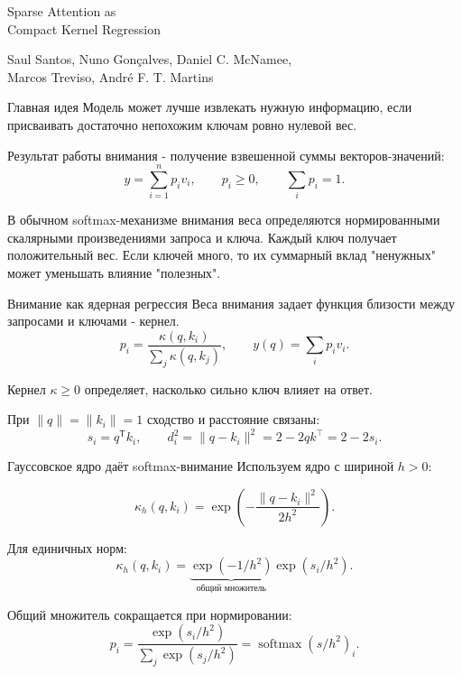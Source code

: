 \documentclass[aspectratio=169,12pt]{beamer}
\begin{document}
\begin{frame}[plain]
  \vspace{5mm}
  {Sparse Attention as\\[1mm]
  Compact Kernel Regression\par}
  \vspace{5mm}
  {\small Saul Santos, Nuno Gonçalves, Daniel C. McNamee,\\
  Marcos Treviso, André F. T. Martins\par}
  \vspace{5mm}
  {\small\phantom{Егор Прокопов}%
    }
\end{frame}

\begin{frame}{Главная идея}
  Модель может лучше извлекать нужную информацию, если присваивать достаточно непохожим
  ключам ровно нулевой вес.

  Результат работы внимания - получение взвешенной суммы векторов-значений:
  $$
    y=\sum_{i=1}^{n}p_i v_i,\qquad p_i\geq 0,\qquad \sum_i p_i=1.
  $$

  В обычном softmax-механизме внимания веса определяются нормированными скалярными
  произведениями запроса и ключа. Каждый ключ получает положительный вес.
  Если ключей много, то их суммарный вклад "ненужных" может уменьшать влияние "полезных". 
\end{frame}

\begin{frame}{Внимание как ядерная регрессия}
  Веса внимания задает функция близости между запросами и ключами - кернел.
  $$
    p_i=\frac{\kappa(q,k_i)}{\sum_j\kappa(q,k_j)},
    \qquad y(q)=\sum_i p_i v_i.
  $$
  
  Кернел $\kappa\geq 0$ определяет, насколько сильно ключ влияет на ответ.

  При $\|q\|=\|k_i\|=1$ сходство и расстояние связаны:
  $$
    s_i=q^{\mathsf T}k_i,
    \qquad d_i^2 = \|q-k_i\|^2 = 2 - 2qk^\top = 2 - 2s_i.
  $$
\end{frame}

\begin{frame}{Гауссовское ядро даёт softmax-внимание}
  Используем ядро с шириной \(h>0\):
  
  $$
    \kappa_{h}(q,k_i)=\exp\!\left(-\frac{\|q-k_i\|^2}{2h^2}\right).
  $$
  
  Для единичных норм:
  $$
    \kappa_{h}(q,k_i)
       =\underbrace{\exp(-1/h^2)}_{\text{общий множитель}}
        \exp(s_i/h^2).
  $$

  Общий множитель сокращается при нормировании:
  $$
    p_i=\frac{\exp(s_i/h^2)}{\sum_j\exp(s_j/h^2)}
       =\operatorname{softmax}(s/h^2)_i.
  $$
\end{frame}
\end{document}

